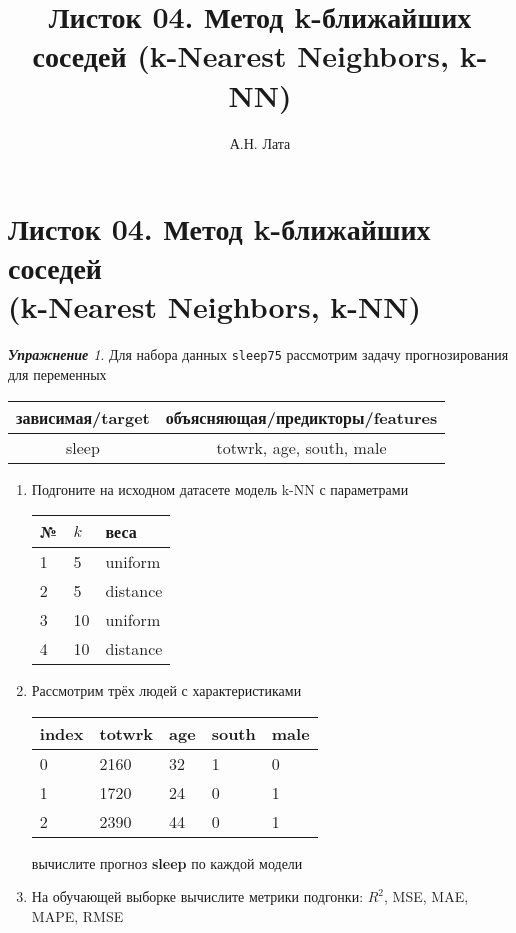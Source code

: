 \documentclass[a4,12pt]{article}
\title{Листок 04. Метод k-ближайших соседей (k-Nearest Neighbors, k-NN)}
\author{А.Н. Лата}
\theoremstyle{remark}
\newtheorem{exercise}{\textbf{Упражнение}}[section]
\begin{document}
\section*{\centering Листок 04. Метод k-ближайших соседей \\ (k-Nearest Neighbors, k-NN)}

\begin{exercise}
Для набора данных \texttt{sleep75} рассмотрим задачу прогнозирования
для переменных
\begin{center}
	\begin{tabular}{|c|c|}\hline
		зависимая/target & объясняющая/предикторы/features \\ \hline
		sleep & totwrk, age, south, male \\ \hline
	\end{tabular}
\end{center}
\begin{enumerate}
	\item Подгоните на исходном датасете модель k-NN с параметрами
	\begin{center}
		\begin{tabular}{|l|l|l|}\hline
		№ & \(k\) & веса \\ \hline
		1 & 5 & uniform \\
		2 & 5 & distance \\
		3 & 10 & uniform \\
		4 & 10 & distance \\ \hline
		\end{tabular}
	\end{center}
	\item Рассмотрим трёх людей с характеристиками
	\begin{center}
		\begin{tabular}{|l||l|l|l|l|}\hline
			index & totwrk & age & south & male \\ \hline\hline
			0 & 2160 & 32 & 1 & 0 \\
			1 & 1720 & 24 & 0 & 1 \\
			2 & 2390 & 44 & 0 & 1 \\ \hline
		\end{tabular}
	\end{center}
	вычислите прогноз \textbf{sleep} по каждой модели

	\item На обучающей выборке вычислите метрики подгонки: \(R^2\), 
	MSE, MAE, MAPE, RMSE
\end{enumerate}
\end{exercise}
\end{document}
